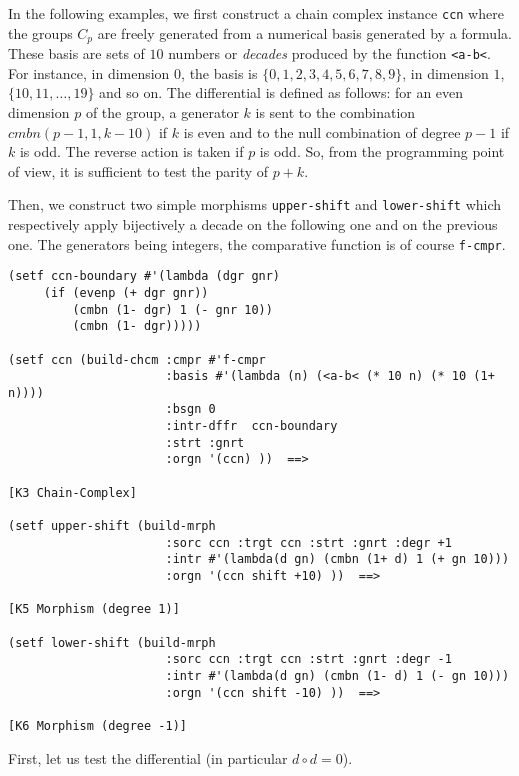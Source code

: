 In the following examples, we first construct a chain complex instance {\tt ccn}
where the groups $C_p$ are freely generated from a numerical basis generated by a formula.
These basis are sets of $10$ numbers or {\em decades} produced by the function {\tt <a-b<}.
For instance, in dimension $0$, the basis is $\lbrace 0,1,2,3,4,5,6,7,8,9 \rbrace$,
in dimension $1$, $\lbrace 10,11,\ldots,19 \rbrace$ and so on.
The differential is defined as follows: for an even dimension $p$ of the group,
a generator $k$ is sent to the combination $cmbn (p-1, 1, k-10)$ if $k$ is even
and to the null combination of degree $p-1$ if $k$ is odd. The reverse action
is taken if $p$ is odd. So, from the programming point of view, it is sufficient to test the
parity of $p+k$.\par
Then, we construct two simple morphisms {\tt upper-shift} and {\tt lower-shift} which
respectively apply bijectively a decade on the following one and on the previous one.
The generators being integers,  the comparative function is of course {\tt f-cmpr}.
{\footnotesize\begin{verbatim}
(setf ccn-boundary #'(lambda (dgr gnr)
     (if (evenp (+ dgr gnr))
         (cmbn (1- dgr) 1 (- gnr 10))
         (cmbn (1- dgr)))))

(setf ccn (build-chcm :cmpr #'f-cmpr
                      :basis #'(lambda (n) (<a-b< (* 10 n) (* 10 (1+ n))))
                      :bsgn 0
                      :intr-dffr  ccn-boundary
                      :strt :gnrt
                      :orgn '(ccn) ))  ==>

[K3 Chain-Complex]

(setf upper-shift (build-mrph
                      :sorc ccn :trgt ccn :strt :gnrt :degr +1
                      :intr #'(lambda(d gn) (cmbn (1+ d) 1 (+ gn 10)))
                      :orgn '(ccn shift +10) ))  ==>

[K5 Morphism (degree 1)]

(setf lower-shift (build-mrph
                      :sorc ccn :trgt ccn :strt :gnrt :degr -1
                      :intr #'(lambda(d gn) (cmbn (1- d) 1 (- gn 10)))
                      :orgn '(ccn shift -10) ))  ==>

[K6 Morphism (degree -1)]
\end{verbatim}}
First, let us test the differential (in particular $d \circ d =0$).

